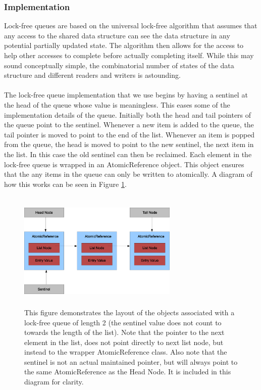 \documentclass[twocolumn]{article}
\begin{document}
\subsubsection{Implementation}
Lock-free queues are based on the universal lock-free algorithm
\cite{LF} that assumes that any access to the shared data structure can
see the data structure in any potential partially updated state.  The
algorithm then allows for the access to help other accesses to
complete before actually completing itself.  While this may sound
conceptually simple, the combinatorial number of states of the data
structure and different readers and writers is astounding.\\
~\\
The lock-free queue implementation that we use begins by having a sentinel
at the head of the queue whose value is meaningless.  This eases some of
the implementation details of the queue.  Initially both the head and tail
pointers of the queue point to the sentinel.  Whenever a new item is added
to the queue, the tail pointer is moved to point to the end of the list.
Whenever an item is popped from the queue, the head is moved to point to
the new sentinel, the next item in the list.  In this case the old
sentinel can then be reclaimed.  Each element in the lock-free queue is
wrapped in an AtomicReference object.  This object ensures that the any
items in the queue can only be written to atomically.  A diagram of how
this works can be seen in Figure \ref{lfqueue}.
\begin{figure}[h]
\centering
\includegraphics[width=3in, height=2.25in]{lfqueue.eps}
\caption{This figure demonstrates the layout of the objects associated with a lock-free queue of length 2 (the sentinel value does not count to towards the length of the list).  Note that the pointer to the next element in the list, does not point directly to next list node, but instead to the wrapper AtomicReference class.  Also note that the sentinel is not an actual maintained pointer, but will always point to the same AtomicReference as the Head Node.  It is included in this diagram for clarity.}
\label{lfqueue}
\end{figure}
\end{document}
